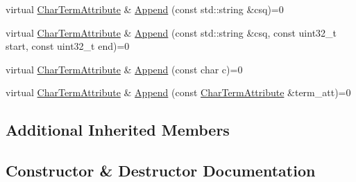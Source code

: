 \begin{DoxyCompactItemize}
virtual \mbox{\hyperlink{classlucene_1_1core_1_1analysis_1_1tokenattributes_1_1CharTermAttribute}{Char\+Term\+Attribute}} \& \mbox{\hyperlink{classlucene_1_1core_1_1analysis_1_1tokenattributes_1_1CharTermAttribute_a721493e2513c3cbb5818cab4ec36e277}{Append}} (const std\+::string \&csq)=0
\item 
virtual \mbox{\hyperlink{classlucene_1_1core_1_1analysis_1_1tokenattributes_1_1CharTermAttribute}{Char\+Term\+Attribute}} \& \mbox{\hyperlink{classlucene_1_1core_1_1analysis_1_1tokenattributes_1_1CharTermAttribute_a1fc0d3eaff550a10e8fc17a5e7bb98bc}{Append}} (const std\+::string \&csq, const uint32\+\_\+t start, const uint32\+\_\+t end)=0
\item 
virtual \mbox{\hyperlink{classlucene_1_1core_1_1analysis_1_1tokenattributes_1_1CharTermAttribute}{Char\+Term\+Attribute}} \& \mbox{\hyperlink{classlucene_1_1core_1_1analysis_1_1tokenattributes_1_1CharTermAttribute_a069f61e1cb30895a205e615c1d154148}{Append}} (const char c)=0
\item 
virtual \mbox{\hyperlink{classlucene_1_1core_1_1analysis_1_1tokenattributes_1_1CharTermAttribute}{Char\+Term\+Attribute}} \& \mbox{\hyperlink{classlucene_1_1core_1_1analysis_1_1tokenattributes_1_1CharTermAttribute_ad8624358a4798446a14fbf35991c43ad}{Append}} (const \mbox{\hyperlink{classlucene_1_1core_1_1analysis_1_1tokenattributes_1_1CharTermAttribute}{Char\+Term\+Attribute}} \&term\+\_\+att)=0
\end{DoxyCompactItemize}
\subsection*{Additional Inherited Members}


\subsection{Constructor \& Destructor Documentation}
\mbox{\label{classlucene_1_1core_1_1analysis_1_1tokenattributes_1_1CharTermAttribute_a44922cdddac47f06e60c0e69c78599ad}} 
